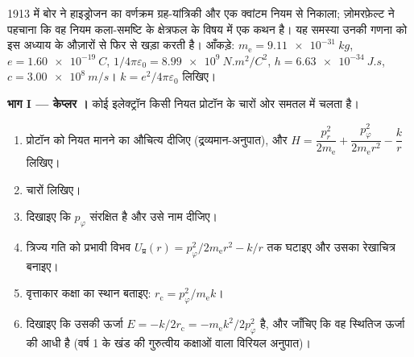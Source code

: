\begin{problem}\label{pb:b3:hamiltonian-mechanics:1}
1913 में बोर ने हाइड्रोजन का वर्णक्रम ग्रह-यांत्रिकी और एक क्वांटम
नियम से निकाला; ज़ोमरफ़ेल्ट ने पहचाना कि वह नियम कला-समष्टि के
क्षेत्रफल के विषय में एक कथन है। यह समस्या उनकी गणना को इस अध्याय के
औज़ारों से फिर से खड़ा करती है। आँकड़े: $m_{\text{e}} =
\qty{9.11e-31}{kg}$, $e = \qty{1.60e-19}{C}$, $1/4\pi\varepsilon_0 =
\qty{8.99e9}{N.m^2/C^2}$, $h = \qty{6.63e-34}{J.s}$, $c =
\qty{3.00e8}{m/s}$। $k = e^2/4\pi\varepsilon_0$ लिखिए।

\medskip\noindent\textbf{भाग I --- केप्लर ।}
कोई इलेक्ट्रॉन किसी नियत प्रोटॉन के चारों ओर समतल में चलता है।
\begin{enumerate}
  \item प्रोटॉन को नियत मानने का औचित्य दीजिए (द्रव्यमान-अनुपात), और
         $H = \dfrac{p_r^2}{2m_{\text{e}}} +
        \dfrac{p_\varphi^2}{2m_{\text{e}}r^2} - \dfrac{k}{r}$ लिखिए।
  \item चारों  लिखिए।
  \item दिखाइए कि $p_\varphi$ संरक्षित है और उसे नाम दीजिए।
  \item त्रिज्य गति को प्रभावी विभव
        $U_{\text{प्र}}(r) = p_\varphi^2/2m_{\text{e}}r^2 - k/r$ तक
        घटाइए और उसका रेखाचित्र बनाइए।
  \item वृत्ताकार कक्षा का स्थान बताइए: $r_{\text{c}} =
        p_\varphi^2/m_{\text{e}}k$।
  \item दिखाइए कि उसकी ऊर्जा $E = -k/2r_{\text{c}} =
        -m_{\text{e}}k^2/2p_\varphi^2$ है, और जाँचिए कि वह स्थितिज
        ऊर्जा की आधी है (वर्ष 1 के खंड की गुरुत्वीय कक्षाओं वाला
        विरियल अनुपात)।
\end{enumerate}


\end{problem}
